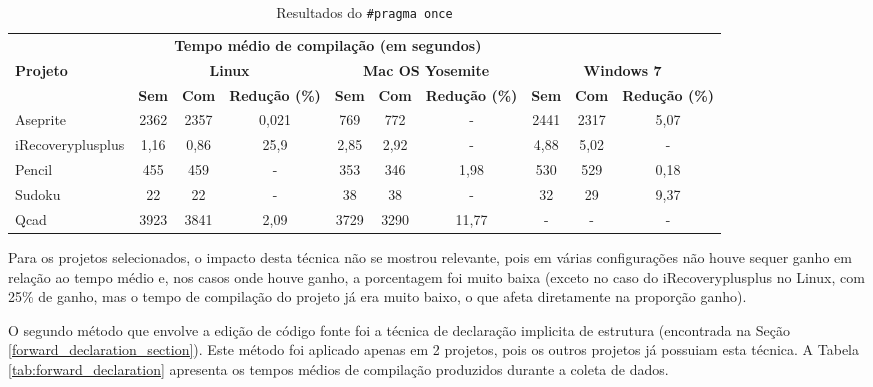 \begin{table}[!ht]
\tiny
\centering
\caption{Resultados do \texttt{\#pragma once}}
\label{tab:pragma}
\begin{tabular}{lccccccccc}
& \multicolumn{6}{c}{\textbf{Tempo médio de compilação (em segundos)} } \\
\textbf{Projeto} & \multicolumn{3}{c}{\textbf{Linux}} & \multicolumn{3}{c}{\textbf{Mac OS Yosemite}} & \multicolumn{3}{c}{\textbf{Windows 7}} \\ 
& \textbf{Sem } & \textbf{Com }  & \textbf{Redução (\%)} & \textbf{Sem } & \textbf{Com }  & \textbf{Redução (\%)} & \textbf{Sem } & \textbf{Com }  & \textbf{Redução (\%)} \\
\toprule
Aseprite & 2362 &  2357 & 0,021     & 769  & 772 &   - &  2441 & 2317 & 5,07 \\
iRecoveryplusplus & 1,16 & 0,86     & 25,9 & 2,85 & 2,92 & - & 4,88     & 5,02 & - \\
Pencil & 455  &  459  &  - &  353   & 346  & 1,98 &  530      & 529 &  0,18 \\
Sudoku & 22   &  22   &  - &  38    & 38   & -  &  32 & 29 & 9,37 \\ 
Qcad   & 3923 &  3841 &  2,09  &  3729  & 3290 & 11,77   & - & -  & - \\ 
\end{tabular}
\end{table}

Para os projetos selecionados, o impacto desta técnica não se mostrou relevante, pois em várias configurações não houve sequer ganho em relação ao tempo médio e, nos casos onde
houve ganho, a porcentagem foi muito baixa (exceto no caso do iRecoveryplusplus no Linux, com 25\% de ganho, mas o tempo de compilação do projeto já era muito baixo, o que afeta diretamente na proporção ganho).

O segundo método que envolve a edição de código fonte foi a técnica de declaração implicita de estrutura (encontrada na Seção \ref{forward_declaration_section}). Este método foi aplicado apenas em 2 projetos, pois os outros projetos já possuiam esta técnica. A Tabela \ref{tab:forward_declaration} apresenta  os tempos médios de compilação produzidos durante a coleta de dados.

